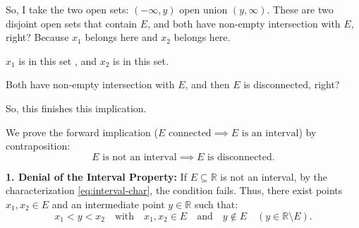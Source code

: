 \begin{proofWrapper}
\begin{speech}[00:07:53 - 00:09:30]
So, I take the two open sets: $(-\infty, y)$ open union $(y, \infty)$. These are two disjoint open sets that contain $E$, and both have non-empty intersection with $E$, right? Because $x_1$ belongs here and $x_2$ belongs here. 

$x_1$ is in this set , and $x_2$ is in this set.

Both have non-empty intersection with $E$, and then $E$ is disconnected, right? 

So, this finishes this implication.
\end{speech}

\begin{content}[Forward Implication (\texorpdfstring{$\implies$}{=>}): Contraposition]
We prove the forward implication ($E \text{ connected} \implies E \text{ is an interval}$) by contraposition:
\[
E \text{ is not an interval} \implies E \text{ is disconnected}.
\]

\textbf{1. Denial of the Interval Property:}
If $E \subseteq \mathbb{R}$ is not an interval, by the characterization \eqref{eq:interval-char}, the condition fails. Thus, there exist points $x_1, x_2 \in E$ and an intermediate point $y \in \mathbb{R}$ such that:
\begin{equation}\label{eq:contra-forward-points}
x_1 < y < x_2 \quad \text{with} \quad x_1, x_2 \in E \quad \text{and} \quad y \notin E \quad (y \in \mathbb{R} \setminus E).
\end{equation}

\begin{center}
\begin{tikzpicture}[scale=1.4]


\end{tikzpicture}
\end{center}
\end{content}
\end{proofWrapper}
